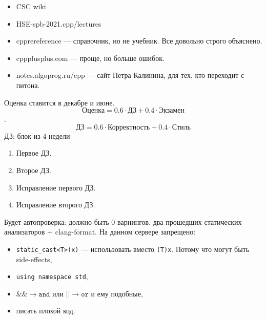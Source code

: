 \begin{itemize}
    \item CSC wiki
    \item HSE-spb-2021.cpp/lectures
    \item cpprereference --- справочник, но не учебник. Все довольно строго объяснено.
    \item cppplusplus.com --- проще, но больше ошибок.
    \item notes.algoprog.ru/cpp --- сайт Петра Калинина, для тех, кто переходит с питона. 
\end{itemize}
Оценка ставится в декабре и июне. \\
$$\text{Оценка} = 0.6\cdot\text{ДЗ} + 0.4\cdot\text{Экзамен}$$. $$\text{ДЗ} = 0.6\cdot\text{Корректность} + 0.4\cdot\text{Стиль}$$
ДЗ: блок из 4 недели
\begin{enumerate}
    \item Первое ДЗ.
    \item Второе ДЗ.
    \item Исправление первого ДЗ.
    \item Исправление второго ДЗ.
\end{enumerate}

Будет автопроверка: должно быть 0 варнингов, два прошедших статических анализаторов + clang-format. На данном сервере запрещено:
\begin{itemize}
    \item \texttt{static\_cast<T>(x)} --- использовать вместо \texttt{(T)x}. Потому что могут быть side-effects,
    \item \texttt{using namespace std},
    \item $\&\& \to \texttt{and}$ или $|| \to \texttt{or}$ и ему подобные,
    \item писать плохой код.
\end{itemize}
